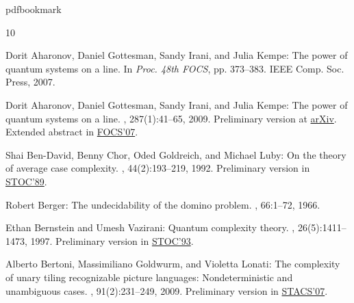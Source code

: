 %
%
%
%
%
\providecommand{\bibhead}[1]{}
%
\expandafter\ifx\csname pdfbookmark\endcsname\relax%
  \providecommand{\tocrefpdfbookmark}{}
\else\providecommand{\tocrefpdfbookmark}{%
   \hypertarget{tocreferences}{}%
   \pdfbookmark[1]{References}{tocreferences}}%
\fi

\tocrefpdfbookmark
\begin{thebibliography}{10}

\bibhead{focsVersion}
{\sc Dorit Aharonov, Daniel Gottesman, Sandy Irani, and Julia Kempe}: The power
  of quantum systems on a line.
\newblock In {\em Proc. 48th FOCS}, pp. 373--383. IEEE Comp. Soc. Press, 2007.

\bibhead{QMA1D}
{\sc Dorit Aharonov, Daniel Gottesman, Sandy Irani, and Julia Kempe}: The power
  of quantum systems on a line.
, 287(1):41--65, 2009.
\newblock Preliminary version at \href{http://arxiv.org/abs/0705.4077}{arXiv}.
  Extended abstract in \href{http://dx.doi.org/10.1109/FOCS.2007.46}{FOCS'07}.
\newblock [\epfmtdoi{10.1007/s00220-008-0710-3}]

\bibhead{bcg89}
{\sc Shai Ben-David, Benny Chor, Oded Goldreich, and Michael Luby}: On the
  theory of average case complexity.
, 44(2):193--219, 1992.
\newblock Preliminary version in
  \href{http://dx.doi.org/10.1145/73007.73027}{STOC'89}.
\newblock [\epfmtdoi{10.1016/0022-0000(92)90019-F}]

\bibhead{berger66}
{\sc Robert Berger}: The undecidability of the domino problem.
, 66:1--72, 1966.

\bibhead{bernsteinVazirani}
{\sc Ethan Bernstein and Umesh Vazirani}: Quantum complexity theory.
, 26(5):1411--1473, 1997.
\newblock Preliminary version in
  \href{http://dx.doi.org/10.1145/167088.167097}{STOC'93}.
\newblock [\epfmtdoi{10.1137/S0097539796300921}]

\bibhead{BGL09}
{\sc Alberto Bertoni, Massimiliano Goldwurm, and Violetta Lonati}: The
  complexity of unary tiling recognizable picture languages: Nondeterministic
  and unambiguous cases.
, 91(2):231--249, 2009.
\newblock Preliminary version in
  \href{http://dx.doi.org/10.1007/978-3-540-70918-3_33}{STACS'07}.
\newblock [\epfmtdoi{10.3233/FI-2009-0042}]


\end{thebibliography}
